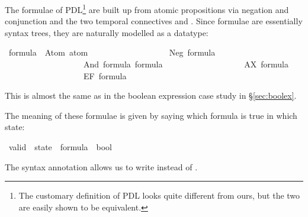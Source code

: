 %
\begin{isabellebody}%
\def\isabellecontext{PDL}%
%
%
\begin{isamarkuptext}%
The formulae of PDL\footnote{The customary definition of PDL
\cite{HarelKT-DL} looks quite different from ours, but the two are easily
shown to be equivalent.} are built up from atomic propositions via
negation and conjunction and the two temporal
connectives  and . Since formulae are essentially
syntax trees, they are naturally modelled as a datatype:%
\end{isamarkuptext}%
\ formula\ {\isacharequal}\ Atom\ atom\isanewline
\ \ \ \ \ \ \ \ \ \ \ \ \ \ \ \ \ \ {\isacharbar}\ Neg\ formula\isanewline
\ \ \ \ \ \ \ \ \ \ \ \ \ \ \ \ \ \ {\isacharbar}\ And\ formula\ formula\isanewline
\ \ \ \ \ \ \ \ \ \ \ \ \ \ \ \ \ \ {\isacharbar}\ AX\ formula\isanewline
\ \ \ \ \ \ \ \ \ \ \ \ \ \ \ \ \ \ {\isacharbar}\ EF\ formula%
\begin{isamarkuptext}%
\noindent
This is almost the same as in the boolean expression case study in
\S\ref{sec:boolex}.

The meaning of these formulae is given by saying which formula is true in
which state:%
\end{isamarkuptext}%
\ valid\ {\isacharcolon}{\isacharcolon}\ {\isachardoublequote}state\ {\isasymRightarrow}\ formula\ {\isasymRightarrow}\ bool{\isachardoublequote}\ \ \ {\isacharparenleft}{\isachardoublequote}{\isacharparenleft}{\isacharunderscore}\ {\isasymTurnstile}\ {\isacharunderscore}{\isacharparenright}{\isachardoublequote}\ {\isacharbrackleft}{}{}{\isacharcomma}{}{}{\isacharbrackright}\ {}{}{\isacharparenright}%
\begin{isamarkuptext}%
\noindent
The syntax annotation allows us to write  instead of
\hbox{}.


\end{isamarkuptext}
\end{isabellebody}

